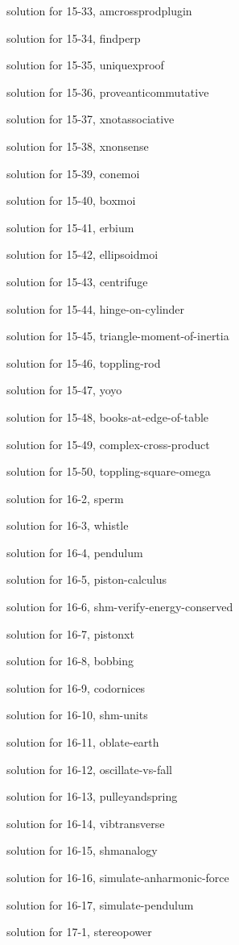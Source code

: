 \documentclass{problems}
\begin{document}
solution for 15-33, amcrossprodplugin

solution for 15-34, findperp

solution for 15-35, uniquexproof

solution for 15-36, proveanticommutative

solution for 15-37, xnotassociative

solution for 15-38, xnonsense

solution for 15-39, conemoi

solution for 15-40, boxmoi

solution for 15-41, erbium

solution for 15-42, ellipsoidmoi

solution for 15-43, centrifuge

solution for 15-44, hinge-on-cylinder

solution for 15-45, triangle-moment-of-inertia

solution for 15-46, toppling-rod

solution for 15-47, yoyo

solution for 15-48, books-at-edge-of-table

solution for 15-49, complex-cross-product

solution for 15-50, toppling-square-omega

solution for 16-2, sperm

solution for 16-3, whistle

solution for 16-4, pendulum

solution for 16-5, piston-calculus

solution for 16-6, shm-verify-energy-conserved

solution for 16-7, pistonxt

solution for 16-8, bobbing

solution for 16-9, codornices

solution for 16-10, shm-units

solution for 16-11, oblate-earth

solution for 16-12, oscillate-vs-fall

solution for 16-13, pulleyandspring

solution for 16-14, vibtransverse

solution for 16-15, shmanalogy

solution for 16-16, simulate-anharmonic-force

solution for 16-17, simulate-pendulum

solution for 17-1, stereopower
\end{document}
